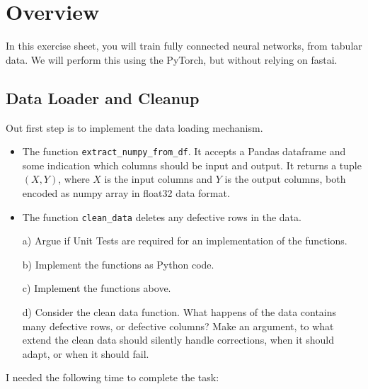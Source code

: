 \def\firstname{Tim}
\def\lastname{Dahmen}
\def\aufgabenblatt{3}




\thispagestyle{page1} 

\section{Overview}

In this exercise sheet, you will train fully connected neural networks, from tabular data. We will perform this using the PyTorch, but without relying on fastai.

\subsection{Data Loader and Cleanup}

Out first step is to implement the data loading mechanism.

\begin{itemize}
\item The function \texttt{extract\_numpy\_from\_df}. It accepts a Pandas dataframe and some indication which columns should be input and output. It returns a tuple $(X,Y)$, where $X$ is the input columns and $Y$ is the output columns, both encoded as numpy array in float32 data format. 
\item The function \texttt{clean\_data} deletes any defective rows in the data.
\end{itemize}

\begin{enumerate}

\item[a)] Argue if Unit Tests are required for an implementation of the functions.

\item[b)] Implement the functions as Python code.

\item[c)] Implement the functions above. 

\item[d)] Consider the clean data function. What happens of the data contains many defective rows, or defective columns? Make an argument, to what extend the clean data should silently handle corrections, when it should adapt, or when it should fail. 

\end{enumerate}

I needed the following time to complete the task:

